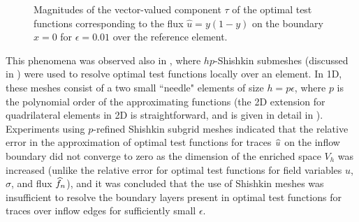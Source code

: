 \begin{figure}[!h]
\centering
{}
\caption{Magnitudes of the vector-valued component $\tau$ of the optimal test functions corresponding to the flux $\widehat{u}=y(1-y)$ on the boundary $x = 0$ for $\epsilon = 0.01$ over the reference element.  }
\label{fig:bl_underresolution}
\end{figure}

This phenomena was observed also in \cite{shishkinDPG}, where $hp$-Shishkin submeshes (discussed in \cite{SchwabBoundaryLayers}) were used to resolve optimal test functions locally over an element.  In 1D, these meshes consist of a two small ``needle" elements of size $h=p \epsilon$, where $p$ is the polynomial order of the approximating functions (the 2D extension for quadrilateral elements in 2D is straightforward, and is given in detail in \cite{shishkinDPG}).  Experiments using $p$-refined Shishkin subgrid meshes indicated that the relative error in the approximation of optimal test functions for traces $\uh$ on the inflow boundary did not converge to zero as the dimension of the enriched space $V_h$ was increased (unlike the relative error for optimal test functions for field variables $u$, $\sigma$, and flux $\fnh$), and it was concluded that the use of Shishkin meshes was insufficient to resolve the boundary layers present in optimal test functions for traces over inflow edges for sufficiently small $\epsilon$.

